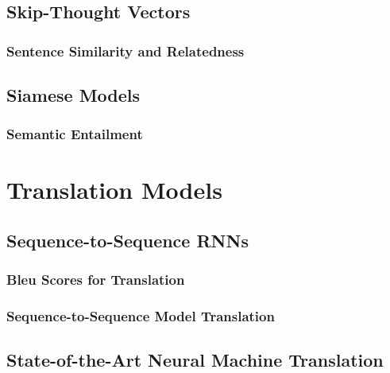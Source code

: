		\subsection{Skip-Thought Vectors} %

			\subsubsection{Sentence Similarity and Relatedness} %

		\subsection{Siamese Models} %

			\subsubsection{Semantic Entailment} %

	\section{Translation Models} %

		\subsection{Sequence-to-Sequence RNNs} %

			\subsubsection{Bleu Scores for Translation} %

			\subsubsection{Sequence-to-Sequence Model Translation} %

		\subsection{State-of-the-Art Neural Machine Translation} %

